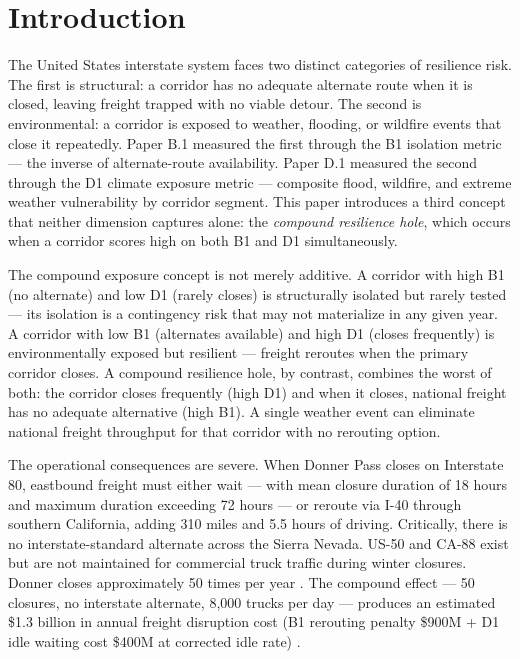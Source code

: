\section{Introduction}

The United States interstate system faces two distinct categories of resilience risk. The first is structural: a corridor has no adequate alternate route when it is closed, leaving freight trapped with no viable detour. The second is environmental: a corridor is exposed to weather, flooding, or wildfire events that close it repeatedly. Paper B.1 measured the first through the B1 isolation metric --- the inverse of alternate-route availability. Paper D.1 measured the second through the D1 climate exposure metric --- composite flood, wildfire, and extreme weather vulnerability by corridor segment. This paper introduces a third concept that neither dimension captures alone: the \textit{compound resilience hole}, which occurs when a corridor scores high on both B1 and D1 simultaneously.

The compound exposure concept is not merely additive. A corridor with high B1 (no alternate) and low D1 (rarely closes) is structurally isolated but rarely tested --- its isolation is a contingency risk that may not materialize in any given year. A corridor with low B1 (alternates available) and high D1 (closes frequently) is environmentally exposed but resilient --- freight reroutes when the primary corridor closes. A compound resilience hole, by contrast, combines the worst of both: the corridor closes frequently (high D1) and when it closes, national freight has no adequate alternative (high B1). A single weather event can eliminate national freight throughput for that corridor with no rerouting option.

The operational consequences are severe. When Donner Pass closes on Interstate 80, eastbound freight must either wait --- with mean closure duration of 18 hours and maximum duration exceeding 72 hours \citep{Caltrans2023} --- or reroute via I-40 through southern California, adding 310 miles and 5.5 hours of driving. Critically, there is no interstate-standard alternate across the Sierra Nevada. US-50 and CA-88 exist but are not maintained for commercial truck traffic during winter closures. Donner closes approximately 50 times per year \citep{Caltrans2023}. The compound effect --- 50 closures, no interstate alternate, 8,000 trucks per day --- produces an estimated \$1.3 billion in annual freight disruption cost (B1 rerouting penalty \$900M + D1 idle waiting cost \$400M at corrected idle rate) \citep{ATRI2024}.

